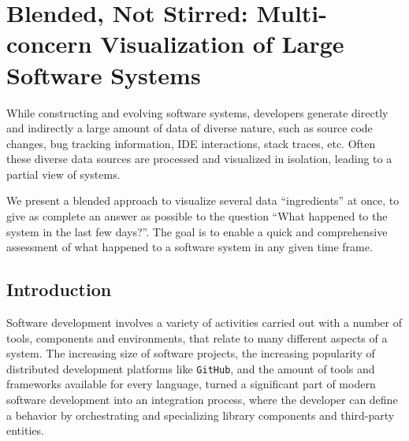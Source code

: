 

\newcommand{\dfl}{\textsc{DFlow}\xspace}
\newcommand{\sli}{\textsc{ShoreLine Reporter}\xspace}
\newcommand{\pha}{\textsc{Pharo}\xspace}


%

\chapter{Blended, Not Stirred: Multi-concern Visualization of Large Software Systems}\label{ch:blend}




While constructing and evolving software systems, developers generate directly and indirectly a large amount of data of diverse nature, such as source code changes, bug tracking information, IDE interactions, stack traces, etc.
Often these diverse data sources are processed and visualized in isolation, leading to a partial view of systems.

We present a blended approach to visualize several data ``ingredients'' at once, to give as complete an answer as possible to the question {``What happened to the system in the last few days?''}.
The goal is to enable a quick and comprehensive assessment of what happened to a software system in any given time frame.



\section{Introduction} \label{sec:intro}

Software development involves a variety of activities carried out with a number of tools, components and environments, that relate to many different aspects of a system.
The increasing size of software projects, the increasing popularity of distributed development platforms like \texttt{GitHub}, and the amount of tools and frameworks available for every language, turned a significant part of modern software development into an integration process, where the developer can define a behavior by orchestrating and specializing library components and third-party entities.


